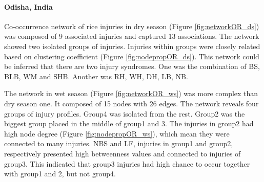 \paragraph{Odisha, India}

Co-occurrence network of rice injuries in dry season (Figure \ref{fig:networkOR_ds}) was composed of 9 associated injuries and captured 13 associations. The network showed two isolated groups of injuries. Injuries within groups were closely related based on clustering coefficient (Figure \ref{fig:nodepropOR_ds}). This network could be inferred that there are two injury syndromes. One was the combination of BS, BLB, WM and SHB. Another was RH, WH, DH, LB, NB.

The network in wet season (Figure \ref{fig:networkOR_ws}) was more complex than dry season one. It composed of 15 nodes with 26 edges. The network reveals four groups of injury profiles. Group4 was isolated from the rest. Group2 was the biggest group placed in the middle of group1 and 3. The injuries in group2 had high node degree (Figure \ref{fig:nodepropOR_ws}), which mean they were connected to many injuries. NBS and LF, injuries in group1 and group2, respectively presented high betweenness values and connected to injuries of group3. This indicated that group3 injuries had high chance to occur together with group1 and 2, but not group4. 


